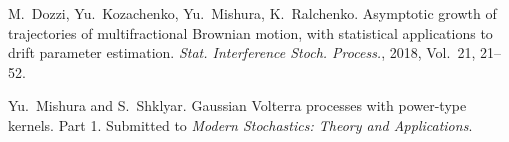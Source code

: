 \documentclass{article}
\theoremstyle{plain}
\begin{document}
\begin{thebibliography}{1}
		M.~Dozzi, Yu.~Kozachenko, Yu.~Mishura, K.~Ralchenko.
		Asymptotic growth of trajectories of multifractional
		Brownian motion, with statistical applications to
		drift parameter estimation.
		\textit{Stat. Interference Stoch. Process.},
		2018, Vol.~21, 21--52.

		Yu.~Mishura and S.~Shklyar.
		Gaussian Volterra processes with power-type kernels.
		Part 1.
		Submitted to \textit{Modern Stochastics: Theory and Applications}.



\end{thebibliography}
\end{document}
